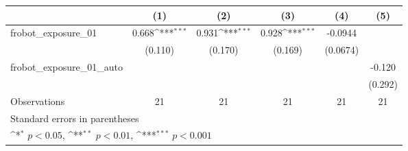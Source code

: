 {
\def\sym#1{\ifmmode^{#1}\else\(^{#1}\)\fi}
\begin{tabular}{l*{5}{c}}
\toprule
                    &\multicolumn{1}{c}{(1)}         &\multicolumn{1}{c}{(2)}         &\multicolumn{1}{c}{(3)}         &\multicolumn{1}{c}{(4)}         &\multicolumn{1}{c}{(5)}         \\
\midrule
frobot\_exposure\_01  &       0.668\sym{***}&       0.931\sym{***}&       0.928\sym{***}&     -0.0944         &                     \\
                    &     (0.110)         &     (0.170)         &     (0.169)         &    (0.0674)         &                     \\
\addlinespace
frobot\_exposure\_01\_auto&                     &                     &                     &                     &      -0.120         \\
                    &                     &                     &                     &                     &     (0.292)         \\
\midrule
Observations        &          21         &          21         &          21         &          21         &          21         \\
\bottomrule
\multicolumn{6}{l}{\footnotesize Standard errors in parentheses}\\
\multicolumn{6}{l}{\footnotesize \sym{*} \(p<0.05\), \sym{**} \(p<0.01\), \sym{***} \(p<0.001\)}\\
\end{tabular}
}
